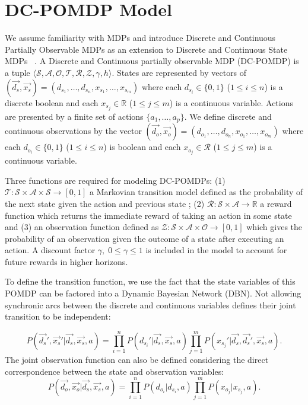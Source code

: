\documentclass{article}
\begin{document}
\section{DC-POMDP Model} 
We assume familiarity with MDPs and introduce Discrete and Continuous Partially Observable MDPs as an extension to Discrete and Continuous State MDPs ~\cite{sanner_uai11}. A Discrete and Continuous partially observable MDP (DC-POMDP) is a tuple $\langle
\mathcal{S},\mathcal{A},\mathcal{O},\mathcal{T},\mathcal{R},\mathcal{Z},\gamma,h \rangle$. 
States are represented by vectors of $(\vec{d_s},\vec{x_s}) = ( d_{s_1},\ldots,d_{s_n},x_{s_1},\ldots,x_{s_m} )$ where each $d_{s_i} \in \{ 0,1 \}$ ($1 \leq i \leq n$) is a discrete boolean and each $x_{s_j} \in \mathbb{R}$ ($1 \leq j \leq m$) is a continuous variable. Actions are presented by a finite set of actions $\{ a_1, \ldots, a_p \}$. We define discrete and continuous observations by the vector $(\vec{d_o},\vec{x_o}) = ( d_{o_1},\ldots,d_{o_n},x_{o_1},\ldots,x_{o_m} )$ where each $d_{o_i} \in \{ 0,1 \}$ ($1 \leq i \leq n$) is boolean and each $x_{o_j} \in \mathcal{R}$ ($1 \leq j \leq m$) is a continuous variable. 

Three functions are required for modeling DC-POMDPs: (1) $\mathcal{T}: \mathcal{S} \times \mathcal{A} \times \mathcal{S} \rightarrow  [ 0, 1 ]$ a Markovian transition model defined as the probability of the next state given the action and previous state%
; (2)  $\mathcal{R}:\mathcal{S}\times\mathcal{A}\rightarrow\mathbb{R}$ a reward function which returns the immediate reward of taking an action in some state and (3) an observation function defined as $\mathcal{Z} : \mathcal{S} \times \mathcal{A} \times \mathcal{O} \rightarrow [ 0, 1 ]$  which gives the probability of an observation given the outcome of a state after executing an action.  A discount factor $\gamma, \; 0 \leq \gamma \leq 1$ is included in the model to account for future rewards in higher horizons.

To define the transition function, we use the fact that the state variables of this POMDP can be factored into a Dynamic Bayesian Network (DBN). Not allowing synchronic arcs between the discrete and continuous variables defines their joint transition to be independent: 

{\footnotesize
\begin{equation}
P(\vec{d_s}',\vec{x_s}'|\vec{d_s},\vec{x_s},a) = 
\prod_{i=1}^n P(d_{s_i}'|\vec{d_s},\vec{x_s},a) \prod_{j=1}^m P(x_{s_j}'|\vec{d_s},\vec{d_s}',\vec{x_s},a). \nonumber 
\end{equation}}
The joint observation function can also be defined considering the direct correspondence between the state and observation variables:
{\footnotesize
\begin{equation}
P(\vec{d_o},\vec{x_o}|\vec{d_s},\vec{x_s},a) = 
\prod_{i=1}^n P(d_{o_i}|d_{s_i},a) \prod_{j=1}^m P(x_{o_j}|x_{s_j},a). \nonumber 
\end{equation}}
\end{document}
